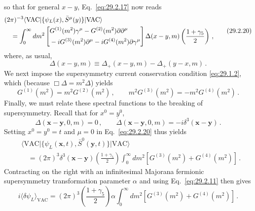 so that for general \(x-y\), Eq.~\eqref{eq:29.2.17} now reads
\begin{equation}
  \begin{aligned}
  &(2\pi)^{-3}
  \langle\mathrm{VAC}\lvert
    \{\psi_L(x),\bar S^\mu(y)\}
  \rvert\mathrm{VAC}\rangle
  \\
  &\quad=
  \int_0^\infty dm^2
  \left[
  \begin{aligned}
    &G^{(1)}(m^2)\gamma^\mu
    -G^{(2)}(m^2)\sl{\partial}\partial^\mu
    \\
    &-iG^{(3)}(m^2)\partial^\mu
    -iG^{(4)}(m^2)\sl{\partial}\gamma^\mu
  \end{aligned}
  \right]
  \Delta(x-y,m)\left(\frac{1+\gamma_5}{2}\right)\,,
  \end{aligned}
  \tag{29.2.20}\label{eq:29.2.20}
\end{equation}
where, as usual,
\begin{equation}
  \Delta(x-y,m)
  \equiv
  \Delta_+(x-y,m)-\Delta_+(y-x,m)\,.
  \tag{29.2.21}\label{eq:29.2.21}
\end{equation}
We next impose the supersymmetry current conservation condition
\eqref{eq:29.1.2}, which (because \(\Box\Delta=m^2\Delta\)) yields
\begin{equation}
  G^{(1)}(m^2)=m^2G^{(2)}(m^2)\,,
  \qquad
  m^2G^{(3)}(m^2)=-m^2G^{(4)}(m^2)\,.
  \tag{29.2.22}\label{eq:29.2.22}
\end{equation}
Finally, we must relate these spectral functions to the breaking of
supersymmetry. Recall that for \(x^0=y^0\),
\[
  \Delta(\mathbf x-\mathbf y,0,m)=0\,,
  \qquad
  \dot\Delta(\mathbf x-\mathbf y,0,m)
  =-i\delta^3(\mathbf x-\mathbf y)\,.
\]
Setting \(x^0=y^0=t\) and \(\mu=0\) in Eq.~\eqref{eq:29.2.20} thus yields
\begin{equation}
  \begin{aligned}
  &\langle\mathrm{VAC}\lvert
    \{\psi_L(\mathbf x,t),\bar S^0(\mathbf y,t)\}
  \rvert\mathrm{VAC}\rangle
  \\
  &\quad=
  (2\pi)^3\delta^3(\mathbf x-\mathbf y)
  \left(\frac{1+\gamma_5}{2}\right)
  \int_0^\infty dm^2
  \left[G^{(3)}(m^2)+G^{(4)}(m^2)\right]\,.
  \end{aligned}
  \tag{29.2.23}\label{eq:29.2.23}
\end{equation}
Contracting on the right with an infinitesimal Majorana fermionic
supersymmetry transformation parameter \(\alpha\) and using
Eq.~\eqref{eq:29.2.11} then gives
\begin{equation}
  i\langle\delta\psi_L\rangle_{\mathrm{VAC}}
  =(2\pi)^3\left(\frac{1+\gamma_5}{2}\right)\alpha
  \int_0^\infty dm^2
  \left[G^{(3)}(m^2)+G^{(4)}(m^2)\right]\,.
  \tag{29.2.24}\label{eq:29.2.24}
\end{equation}
